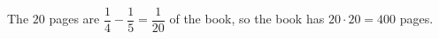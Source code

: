 The \(20\) pages are \(\dfrac{1}{4}-\dfrac{1}{5}=\dfrac{1}{20}\) of the book, so the book has \(20\cdot 20=\boxed{400}\) pages.
